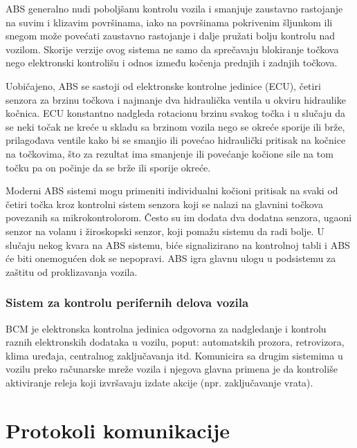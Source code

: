 \documentclass[a4paper]{article}
\begin{document}
ABS generalno nudi poboljšanu kontrolu vozila i smanjuje zaustavno rastojanje na suvim i klizavim površinama, iako na površinama pokrivenim šljunkom ili snegom može povećati zaustavno rastojanje i dalje pružati bolju kontrolu nad vozilom. Skorije verzije ovog sistema ne samo da sprečavaju blokiranje točkova nego elektronski kontrolišu i odnos između kočenja prednjih i zadnjih točkova.

Uobičajeno, ABS se sastoji od elektronske kontrolne jedinice (ECU), četiri senzora za brzinu točkova i najmanje dva hidraulička ventila u okviru hidraulike kočnica. ECU konstantno nadgleda rotacionu brzinu svakog točka i u slučaju da se neki točak ne kreće u skladu sa brzinom vozila nego se okreće sporije ili brže, prilagođava ventile kako bi se smanjio ili povećao hidraulički pritisak na kočnice na točkovima, što za rezultat ima smanjenje ili povećanje kočione sile na tom točku pa on počinje da se brže ili sporije okreće.

Moderni ABS sistemi mogu primeniti individualni kočioni pritisak na svaki od četiri točka kroz kontrolni sistem senzora koji se nalazi na glavnini točkova povezanih sa mikrokontrolorom. Često su im dodata dva dodatna senzora, ugaoni senzor na volanu i žiroskopski senzor, koji pomažu sistemu da radi bolje. U slučaju nekog kvara na ABS sistemu, biće signalizirano na kontrolnoj tabli i ABS će biti onemogućen dok se nepopravi. ABS igra glavnu ulogu u podsistemu za zaštitu od proklizavanja vozila.

\subsubsection{Sistem za kontrolu perifernih delova vozila}
\label{subsubsec:BCM}

BCM je elektronska kontrolna jedinica odgovorna za nadgledanje i kontrolu raznih elektronskih dodataka u vozilu, poput: automatskih prozora, retrovizora, klima uređaja, centralnog zaključavanja itd. Komunicira sa drugim sistemima u vozilu preko računarske mreže vozila i njegova glavna primena je da kontroliše aktiviranje releja koji izvršavaju izdate akcije (npr. zaključavanje vrata).

\section{Protokoli komunikacije}
\label{sec:protokoli}
\end{document}
